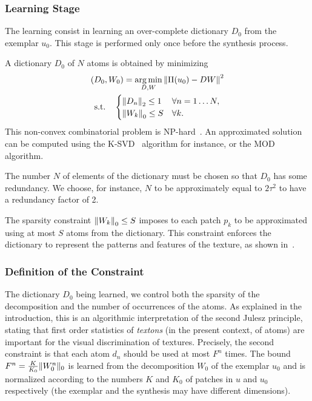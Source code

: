 \subsubsection{Learning Stage}

The learning consist in learning an over-complete dictionary $D_0$ from the exemplar $u_0$.
This stage is performed only once before the synthesis process.

A dictionary $D_0$ of $N$ atoms is obtained by minimizing
\begin{multline}
  \label{eq:dico-learning}
  (D_0,W_0) =
    \operatorname*{arg\,min}_{D,W}
    \left\|\Pi(u_0) - DW\right\|^2  \\
    \text{s.t.}             \quad
    \begin{cases}
      \left\|D_n\right\|_2 \leq 1 & \forall n=1\dots N, \\
      \left\|W_k\right\|_0 \leq S & \forall k.
    \end{cases}
\end{multline}
This non-convex combinatorial problem is NP-hard~\cite{tropp2004greed}.
An approximated solution can be computed using the K-SVD~\cite{aharon2006ksvd} algorithm for instance, or the MOD~\cite{engan1999method} algorithm.

The number $N$ of elements of the dictionary must be chosen so that $D_0$ has some redundancy.
We choose, for instance, $N$ to be approximately equal to $2\tau^2$ to have a redundancy factor of 2.

The sparsity constraint $\left\|W_k\right\|_0\leq S$ imposes to each patch $p_k$ to be approximated using at most $S$ atoms from the dictionary.
This constraint enforces the dictionary to represent the patterns and features of the texture, as shown in~\cite{peyre2009sparse}.


\subsubsection{Definition of the Constraint}

The dictionary $D_0$ being learned, we control both the sparsity of the decomposition and the number of occurrences of the atoms.
As explained in the introduction, this is an algorithmic interpretation of the second Julesz principle, stating that first order statistics of {\it textons} (in the present context, of atoms) are important for the visual discrimination of textures.
Precisely, the second constraint is that each atom $d_n$ should be used at most $F^n$ times.
The bound $F^n = \frac{K}{K_0}\|W_0^n\|_0$ is learned from the decomposition $W_0$ of the exemplar $u_0$ and is normalized according to the numbers $K$ and $K_0$ of patches in $u$ and $u_0$ respectively (the exemplar and the synthesis may have different dimensions).

